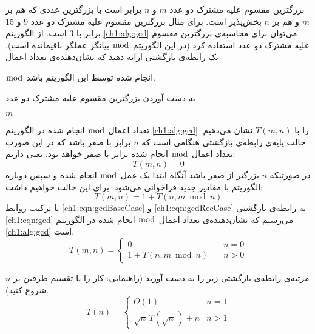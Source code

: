  بزرگترین مقسوم ‌علیه مشترک دو عدد {$m$} و {$n$} برابر است با بزرگترین عددی که هم بر {$m$} و هم بر {$n$} بخش‌پذیر است. برای مثال بزرگترین مقسوم ‌علیه مشترک دو عدد 9 و 15 برابر با 3 است. از الگوریتم {\eqref{ch1:alg:gcd}} می‌توان برای محاسبه‌ی بزرگترین مقسوم ‌علیه مشترک دو عدد استفاده کرد (در این الگوریتم {$\bmod$} بیانگر عملگر باقیمانده است). یک رابطه‌ی بازگشتی‌ ارائه دهید که نشان‌دهنده‌ی تعداد اعمال {{$\bmod$ انجام شده توسط این الگوریتم باشد.

\begin{algorithm}
\caption{به دست آوردن بزرگترین مقسوم علیه مشترک دو عدد}\label{ch1:alg:gcd}
\begin{latin}
\begin{algorithmic}[1]
				\State {}
		\EndIf
			\State \Return $m$
		\Else
			\State \Return {}
		\EndIf
\EndFunction
\end{algorithmic}
\end{latin}
\end{algorithm}


تعداد اعمال {$\bmod$} انجام شده در الگوریتم {\eqref{ch1:alg:gcd}} را با {$T(m,n)$} نشان می‌دهیم. حالت پایه‌‌ی رابطه‌‌ی بازگشتی هنگامی است که {$n$} برابر با صفر باشد که در این صورت تعداد اعمال {$\bmod$} انجام شده برابر با صفر خواهد بود. یعنی داریم:
\begin{equation}
T(m,n)=0\label{ch1:eqn:gcdBaseCase}
\end{equation}
در صورتیکه {$n$} بزرگتر از صفر باشد آنگاه ابتدا یک عمل {$\bmod$} انجام شده و سپس دوباره الگوریتم با مقادیر جدید فراخوانی می‌شود. برای این حالت خواهیم داشت:
\begin{equation}
T(m,n)=1+T(n, m \bmod n)\label{ch1:eqn:gcdRecCase}
\end{equation}
با ترکیب روابط {\eqref{ch1:eqn:gcdBaseCase}} و {\eqref{ch1:eqn:gcdRecCase}} به رابطه‌ی بازگشتی {\eqref{ch1:eqn:gcd}} می‌رسیم که نشان‌دهنده‌ی تعداد اعمال {$\bmod$} انجام شده در الگوریتم {\eqref{ch1:alg:gcd}} است.
\begin{equation}
T(m,n) =
\begin{cases}
0 & \quad n=0\\
1+T(n,m\bmod n) & \quad n>0
\end{cases}\label{ch1:eqn:gcd}
\end{equation}

 مرتبه‌ی رابطه‌ی بازگشتی زیر را به دست آورید (راهنمایی: کار را با تقسیم طرفین بر {$n$} شروع کنید).
\begin{displaymath}
T(n)=
\begin{cases}
\Theta (1) & n=1\\
\sqrt{n}\,T\left(\sqrt{n}\,\right)+n & n>1
\end{cases}
\end{displaymath}

}}
